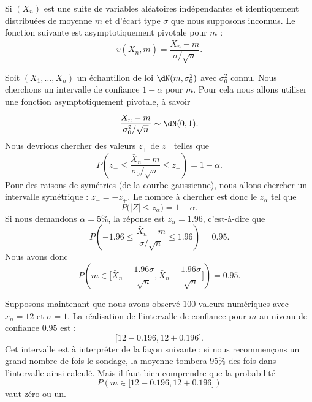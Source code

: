 \begin{example}
	Si \( (X_n)\) est une suite de variables aléatoires indépendantes et identiquement distribuées de moyenne \( m\) et d'écart type \( \sigma\) que nous supposons inconnus. Le fonction suivante est asymptotiquement pivotale pour \( m\) :
	\begin{equation}
		v(\bar X_n,m)=\frac{ \bar X_n-m }{ \sigma/\sqrt{n} }.
	\end{equation}
\end{example}

Soit \( (X_1,\ldots,X_n)\) un échantillon de loi \( \dN(m,\sigma_0^2)\) avec \( \sigma_0^2\) connu. Nous cherchons un intervalle de confiance \( 1-\alpha\) pour \( m\). Pour cela nous allons utiliser une fonction asymptotiquement pivotale, à savoir
\begin{equation}
	\frac{ \bar X_n-m }{ \sigma_0^2/\sqrt{n} }\sim\dN(0,1).
\end{equation}
Nous devrions chercher des valeurs \( z_+\) de \( z_-\) telles que
\begin{equation}
	P\left( z_-\leq \frac{ \bar X_n-m }{ \sigma_0/\sqrt{n} }\leq z_+ \right)=1-\alpha.
\end{equation}
Pour des raisons de symétries (de la courbe gaussienne), nous allons chercher un intervalle symétrique : \( z_-=-z_+\). Le nombre à chercher est donc le \( z_{\alpha}\) tel que
\begin{equation}
	P\big( | Z |\leq z_{\alpha} \big)=1-\alpha.
\end{equation}
Si nous demandons \( \alpha=5\%\), la réponse est \( z_{\alpha}=1.96\), c'est-à-dire que
\begin{equation}
	P\left( -1.96\leq \frac{ \bar X_n-m }{ \sigma/\sqrt{n} }\leq 1.96 \right)=0.95.
\end{equation}
Nous avons donc
\begin{equation}
	P\left( m\in\big[ \bar X_n-\frac{ 1.96\sigma }{ \sqrt{n} },\bar X_n+\frac{ 1.96\sigma }{ \sqrt{n} } \big] \right)=0.95.
\end{equation}

Supposons maintenant que nous avons observé \( 100\) valeurs numériques avec \( \bar x_n=12\) et \( \sigma=1\). La réalisation de l'intervalle de confiance pour \( m\) au niveau de confiance \( 0.95\) est :
\begin{equation}
	\big[ 12-0.196,12+0.196 \big].
\end{equation}
Cet intervalle est à interpréter de la façon suivante : si nous recommençons un grand nombre de fois le sondage, la moyenne tombera \( 95\%\) des fois dans l'intervalle ainsi calculé. Mais il faut bien comprendre que la probabilité
\begin{equation}
	P\left( m\in\big[ 12-0.196,12+0.196 \big] \right)
\end{equation}
vaut zéro ou un.


